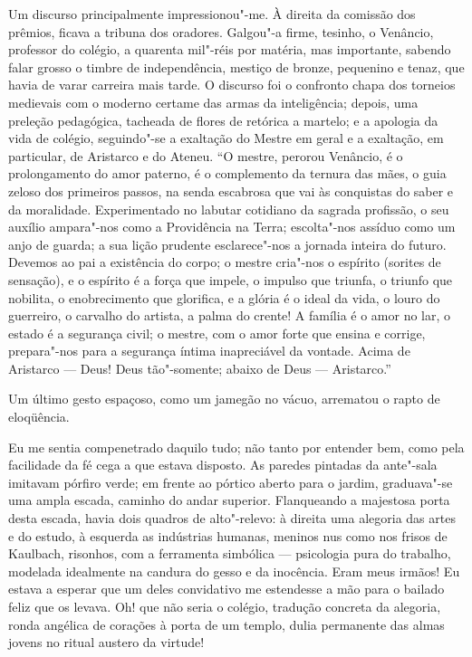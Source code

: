 Um discurso principalmente impressionou"-me. À direita
da comissão dos prêmios, ficava a tribuna dos oradores. Galgou"-a
firme, tesinho, o Venâncio, professor do colégio, a quarenta mil"-réis
por matéria, mas importante, sabendo falar grosso o timbre de
independência, mestiço de bronze, pequenino e tenaz, que havia de varar
carreira mais tarde. O discurso foi o confronto chapa dos torneios
medievais com o moderno certame das armas da inteligência; depois, uma
preleção pedagógica, tacheada de flores de retórica a martelo; e a
apologia da vida de colégio, seguindo"-se a exaltação do Mestre em
geral e a exaltação, em particular, de Aristarco e do Ateneu. ``O
mestre, perorou Venâncio, é o prolongamento do amor paterno, é o complemento da
ternura das mães, o guia zeloso dos primeiros passos, na senda
escabrosa que vai às conquistas do saber e da moralidade. Experimentado
no labutar cotidiano da sagrada profissão, o seu auxílio ampara"-nos
como a Providência na Terra; escolta"-nos assíduo como um anjo de
guarda; a sua lição prudente esclarece"-nos a jornada inteira do futuro.
Devemos ao pai a existência do corpo; o mestre cria"-nos o espírito
(sorites de sensação), e o espírito é a força que impele, o impulso que
triunfa, o triunfo que nobilita, o enobrecimento que glorifica, e a
glória é o ideal da vida, o louro do guerreiro, o carvalho do artista,
a palma do crente! A família é o amor no lar, o estado é a segurança
civil; o mestre, com o amor forte que ensina e corrige, prepara"-nos
para a segurança íntima inapreciável da vontade. Acima de Aristarco --- 
Deus! Deus tão"-somente; abaixo de Deus --- Aristarco.'' 

Um último gesto espaçoso, como um jamegão no vácuo, arrematou o rapto de
eloqüência. 

Eu me sentia compenetrado daquilo tudo; não tanto por
entender bem, como pela facilidade da fé cega a que estava disposto. As
paredes pintadas da ante"-sala imitavam pórfiro verde; em frente ao
pórtico aberto para o jardim, graduava"-se uma ampla escada, caminho
do andar superior. Flanqueando a majestosa porta desta escada, havia
dois quadros de alto"-relevo: à direita uma alegoria das artes e do
estudo, à esquerda as indústrias humanas, meninos nus como nos frisos
de Kaulbach, risonhos, com a ferramenta simbólica --- psicologia pura
do trabalho, modelada idealmente na candura do gesso e da inocência.
Eram meus irmãos! Eu estava a esperar que um deles convidativo me
estendesse a mão para o bailado feliz que os levava. Oh! que não seria
o colégio, tradução concreta da alegoria, ronda angélica de corações à
porta de um templo, dulia permanente das almas jovens no ritual austero
da virtude! 

